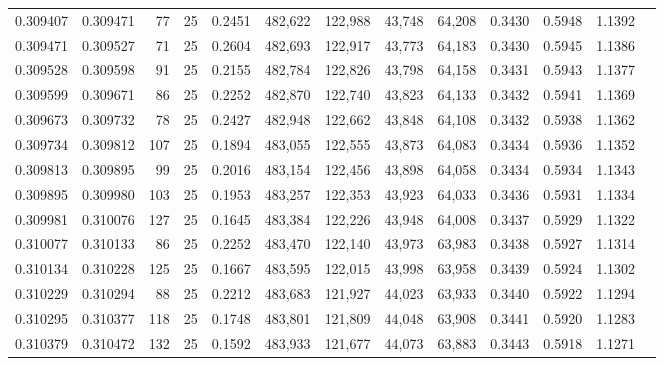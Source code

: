 \begin{tabular}{rrrrrrrrrrrrr}
0.309407 & 0.309471 &    77 &  25 &                                     0.2451 & 482,622 & 122,988 &  43,748 &  64,208 & 0.3430 & 0.5948 & 1.1392 \\
0.309471 & 0.309527 &    71 &  25 &                                     0.2604 & 482,693 & 122,917 &  43,773 &  64,183 & 0.3430 & 0.5945 & 1.1386 \\
0.309528 & 0.309598 &    91 &  25 &                                     0.2155 & 482,784 & 122,826 &  43,798 &  64,158 & 0.3431 & 0.5943 & 1.1377 \\
0.309599 & 0.309671 &    86 &  25 &                                     0.2252 & 482,870 & 122,740 &  43,823 &  64,133 & 0.3432 & 0.5941 & 1.1369 \\
0.309673 & 0.309732 &    78 &  25 &                                     0.2427 & 482,948 & 122,662 &  43,848 &  64,108 & 0.3432 & 0.5938 & 1.1362 \\
0.309734 & 0.309812 &   107 &  25 &                                     0.1894 & 483,055 & 122,555 &  43,873 &  64,083 & 0.3434 & 0.5936 & 1.1352 \\
0.309813 & 0.309895 &    99 &  25 &                                     0.2016 & 483,154 & 122,456 &  43,898 &  64,058 & 0.3434 & 0.5934 & 1.1343 \\
0.309895 & 0.309980 &   103 &  25 &                                     0.1953 & 483,257 & 122,353 &  43,923 &  64,033 & 0.3436 & 0.5931 & 1.1334 \\
0.309981 & 0.310076 &   127 &  25 &                                     0.1645 & 483,384 & 122,226 &  43,948 &  64,008 & 0.3437 & 0.5929 & 1.1322 \\
0.310077 & 0.310133 &    86 &  25 &                                     0.2252 & 483,470 & 122,140 &  43,973 &  63,983 & 0.3438 & 0.5927 & 1.1314 \\
0.310134 & 0.310228 &   125 &  25 &                                     0.1667 & 483,595 & 122,015 &  43,998 &  63,958 & 0.3439 & 0.5924 & 1.1302 \\
0.310229 & 0.310294 &    88 &  25 &                                     0.2212 & 483,683 & 121,927 &  44,023 &  63,933 & 0.3440 & 0.5922 & 1.1294 \\
0.310295 & 0.310377 &   118 &  25 &                                     0.1748 & 483,801 & 121,809 &  44,048 &  63,908 & 0.3441 & 0.5920 & 1.1283 \\
0.310379 & 0.310472 &   132 &  25 &                                     0.1592 & 483,933 & 121,677 &  44,073 &  63,883 & 0.3443 & 0.5918 & 1.1271 \\

\end{tabular}
